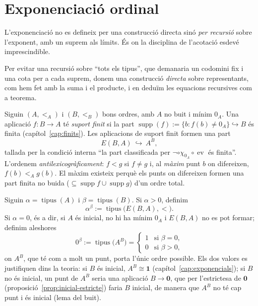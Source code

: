 \section{Exponenciació ordinal}\label{sec:exponenciacio-ordinal}

L'exponenciació no es defineix per una construcció directa sinó \emph{per
recursió} sobre l'exponent, amb un suprem als límits. És on la disciplina de
l'acotació esdevé imprescindible.

Per evitar una recursió sobre \enquote{tots els tipus}, que demanaria un
codomini fix i una cota per a cada suprem, donem una construcció
\emph{directa} sobre representants, com hem fet amb la suma i el producte,
i en deduïm les equacions recursives com a teorema.

\begin{definicio}\label{def:suport-finit}
Siguin \((A,<_A)\) i \((B,<_B)\) bons ordres, amb \(A\) no buit i mínim
\(0_A\). Una aplicació \(f\colon B\to A\) té \emph{suport finit} si la part
\(\operatorname{supp}(f):=\{b:f(b)\neq0_A\}\hookrightarrow B\) és finita
(capítol~\ref{cap:finits}). Les aplicacions de suport finit formen una part
\[
E(B,A)\ \hookrightarrow\ A^{B},
\]
tallada per la condició interna \enquote{la part classificada per
\(\neg\circ\chi_{0_A}\circ\operatorname{ev}\) és finita}. L'ordenem
\emph{antilexicogràficament}: \(f<g\) si \(f\neq g\) i, al \emph{màxim}
punt \(b\) on difereixen, \(f(b)<_Ag(b)\). El màxim existeix perquè els
punts on difereixen formen una part finita no buida
(\(\subseteq\operatorname{supp}f\cup\operatorname{supp}g\)) d'un ordre
total.
\end{definicio}

\begin{definicio}\label{def:exponenciacio-ordinal}
Siguin \(\alpha=\operatorname{tipus}(A)\) i \(\beta=\operatorname{tipus}(B)\).
Si \(\alpha>0\), definim
\[
\alpha^{\beta}:=\operatorname{tipus}\bigl(E(B,A),<\bigr).
\]
Si \(\alpha=0\), és a dir, si \(A\) és inicial, no hi ha mínim \(0_A\) i
\(E(B,A)\) no es pot formar; definim aleshores
\[
0^{\beta}:=\operatorname{tipus}\bigl(A^{B}\bigr)
=\begin{cases}1&\text{si }\beta=0,\\0&\text{si }\beta>0,\end{cases}
\]
on \(A^{B}\), que té com a molt un punt, porta l'únic ordre possible. Els
dos valors es justifiquen dins la teoria: si \(B\) és inicial,
\(A^{B}\cong\mathbf1\) (capítol~\ref{cap:exponencials}); si \(B\) no és
inicial, un punt de \(A^{B}\) seria una aplicació \(B\to\mathbf0\), que per
l'estrictesa de \(\mathbf0\) (proposició~\ref{prop:inicial-estricte}) faria
\(B\) inicial, de manera que \(A^{B}\) no té cap punt i és inicial (lema
del buit).
\end{definicio}

